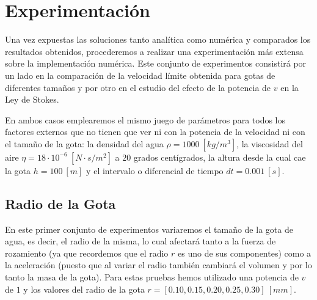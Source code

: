 \documentclass[journal]{IEEEtran}
\begin{document}
\section{Experimentación}

Una vez expuestas las soluciones tanto analítica como numérica y comparados los resultados obtenidos, procederemos a realizar una experimentación más extensa sobre la implementación numérica. Este conjunto de experimentos consistirá por un lado en la comparación de la velocidad límite obtenida para gotas de diferentes tamaños y por otro en el estudio del efecto de la potencia de $v$ en la Ley de Stokes.

En ambos casos emplearemos el mismo juego de parámetros para todos los factores externos que no tienen que ver ni con la potencia de la velocidad ni con el tamaño de la gota: la densidad del agua $\rho = 1000~[kg/m^3]$, la viscosidad del aire $\eta = 18 \cdot 10^{-6}~[N\cdot s/m^2]$ a $20$ grados centígrados, la altura desde la cual cae la gota $h = 100~[m]$ y el intervalo o diferencial de tiempo $dt = 0.001~[s]$.

\subsection{Radio de la Gota}

En este primer conjunto de experimentos variaremos el tamaño de la gota de agua, es decir, el radio de la misma, lo cual afectará tanto a la fuerza de rozamiento (ya que recordemos que el radio $r$ es uno de sus componentes) como a la aceleración (puesto que al variar el radio también cambiará el volumen y por lo tanto la masa de la gota). Para estas pruebas hemos utilizado una potencia de $v$ de $1$ y los valores del radio de la gota $r = [0.10, 0.15, 0.20, 0.25, 0.30]~[mm]$.
\end{document}
